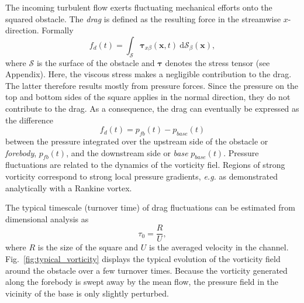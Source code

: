 \documentclass{jfm}
\begin{document}

%
The incoming turbulent flow exerts fluctuating mechanical efforts onto the squared obstacle.
The \textit{drag} is defined as the resulting force in the streamwise $x$-direction. Formally 
\begin{equation}
\label{eq:drag_definition}
f_d(t) = \int_{\mathcal{S}} \boldsymbol{\tau}_{x \beta}(\mathbf{x},t) ~ \mathrm{d}{\mathcal{S}}_\beta(\mathbf{x}),
\end{equation}
where $\mathcal{S}$ is the surface of the obstacle and $\boldsymbol{\tau}$ denotes the stress tensor (see Appendix). 
Here, the viscous stress makes a negligible contribution to the drag. The latter therefore results mostly from pressure forces.
%
Since the pressure on the top and bottom sides of the square applies in the normal direction, they do not contribute to the drag. 
As a consequence, the drag can eventually be expressed as the difference 
\begin{equation}
\label{eq:drag_approx}
f_d(t) = p_{fb}(t) - p_{base}(t)
\end{equation}
between the pressure integrated over the upstream side of the obstacle or \textit{forebody}, $p_{fb}(t)$, and the downstream side or \textit{base} $p_{base}(t)$.
Pressure fluctuations are related to the dynamics of the vorticity fiel.
Regions of strong vorticity correspond to strong local pressure gradients, \emph{e.g.} as demonstrated analytically with a Rankine vortex.
%
%

%
The typical timescale (turnover time) of drag fluctuations can be estimated from dimensional analysis as
\begin{equation}
\label{eq:turnover_time}
\tau_0 = \frac{R}{U},
\end{equation}
where $R$ is the size of the square and $U$ is the averaged velocity in the channel. 
%
%
Fig.~\ref{fig:typical_vorticity} displays the typical evolution of the vorticity field around the obstacle over a few turnover times.
Because the vorticity generated along the forebody is swept away by the mean flow, the pressure field in the vicinity of the base is only slightly perturbed.
\end{document}
